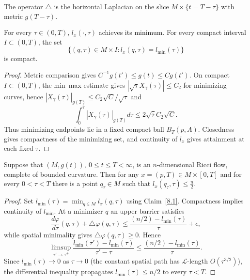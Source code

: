 \begin{remark}
\label{rem:horizontal-laplacian-convention}
The operator $\triangle$ is the horizontal Laplacian on the slice
$M\times\{t=T-\tau\}$ with metric $g(T-\tau)$.
\end{remark}

\begin{claim}
\label{claim:l-min-achieved-compact}
\label{8.1}
For every $\tau\in(0,T)$, $l_x(\cdot,\tau)$ achieves its minimum. For
every compact interval $I\subset(0,T)$, the set
\[
\{(q,\tau)\in M\times I:l_x(q,\tau)=l_\mathrm{min}(\tau)\}
\]
is compact.
\end{claim}

\begin{proof}\sketch
{}
Metric comparison gives $C^{-1}g(t')\le g(t)\le Cg(t')$. On compact
$I\subset(0,T)$, the min--max estimate gives
$|\sqrt{\tau}X_\gamma(\tau)|\le C_2$ for minimizing curves, hence
$|X_\gamma(\tau)|_{g(T)}\le C_2\sqrt C/\sqrt\tau$ and
\[
\int_0^{\bar\tau}|X_\gamma(\tau)|_{g(T)}d\tau
\le2\sqrt{\bar\tau}C_2\sqrt C.
\]
Thus minimizing endpoints lie in a fixed compact ball $B_T(p,A)$.
Closedness gives compactness of the minimizing set, and continuity of
$l_x$ gives attainment at each fixed $\tau$.
\end{proof}

\begin{theorem}
\label{thm:min-l-bound-n-half}
\label{n/2} Suppose that $(M,g(t)),\ 0\le t\le T<\infty$,
is an $n$-dimensional Ricci flow, complete of bounded curvature.
Then for any $x=(p,T)\in M\times [0,T]$ and for every $0<\tau<T$
there is a point $q_\tau\in M$ such that $l_{x}(q_\tau,\tau)\le
\frac{n}{2}$.
\end{theorem}

\begin{proof}\sketch
{}
Set $l_\mathrm{min}(\tau)=\min_{q\in M}l_x(q,\tau)$ using
Claim~\ref{8.1}. Compactness implies continuity of $l_\mathrm{min}$. At a
minimizer $q$ an upper barrier satisfies
\[
\frac{d\varphi}{d\tau}(q,\tau)+\triangle\varphi(q,\tau)
\le\frac{(n/2)-l_\mathrm{min}(\tau)}{\tau}+\epsilon,
\]
while spatial minimality gives $\triangle\varphi(q,\tau)\ge0$. Hence
\[
\limsup_{\tau'\to\tau^+}\frac{l_\mathrm{min}(\tau')-l_\mathrm{min}(\tau)}{\tau'-\tau}
\le\frac{(n/2)-l_\mathrm{min}(\tau)}{\tau}.
\]
Since $l_\mathrm{min}(\tau)\to0$ as $\tau\to0$ (the constant spatial path
has ${\mathcal L}$-length $O(\tau^{3/2})$), the differential inequality
propagates $l_\mathrm{min}(\tau)\le n/2$ to every $\tau<T$.
\end{proof}


